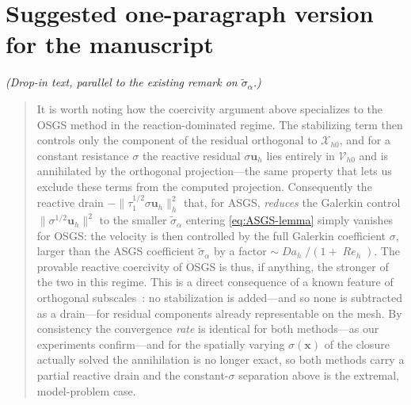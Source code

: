 \documentclass[11pt]{article}
\newcommand{\Reyn}{\operatorname{\mathit{Re}}}
\newcommand{\Damk}{\operatorname{\mathit{Da}}}
\theoremstyle{plain}
\theoremstyle{remark}
\newcommand{\uh}{\boldsymbol{u}_h}
\newcommand{\Xh}{\mathcal{X}_{h0}}
\newcommand{\siga}{\widetilde{\sigma}_\alpha}
\begin{document}
\section*{Suggested one-paragraph version for the manuscript}
\noindent\textit{(Drop-in text, parallel to the existing remark on $\siga$.)}
\begin{quote}\small
It is worth noting how the coercivity argument above specializes to the OSGS method
in the reaction-dominated regime. The stabilizing term then controls only the
component of the residual orthogonal to $\Xh$, and for a constant resistance
$\sigma$ the reactive residual $\sigma\uh$ lies entirely in $\mathcal{V}_{h0}$ and
is annihilated by the orthogonal projection---the same property that lets us exclude
these terms from the computed projection. Consequently the reactive drain
$-\|\tau_1^{1/2}\sigma\uh\|_h^2$ that, for ASGS, \emph{reduces} the Galerkin control
$\|\sigma^{1/2}\uh\|^2$ to the smaller $\siga$ entering \cref{eq:ASGS-lemma} simply
vanishes for OSGS: the velocity is then controlled by the full Galerkin coefficient
$\sigma$, larger than the ASGS coefficient $\siga$ by a factor
$\sim\Damk_h/(1+\Reyn_h)$. The provable reactive coercivity of OSGS is thus, if
anything, the stronger of the two in this regime. This is a direct consequence of a
known feature of orthogonal
subscales~\cite{gravenkamp2023dispersed,codina2002stabilized}: no stabilization is
added---and so none is subtracted as a drain---for residual components already
representable on the mesh. By consistency the convergence \emph{rate} is identical
for both methods---as our experiments confirm---and for the spatially varying
$\sigma(\boldsymbol{x})$ of the closure actually solved the annihilation is no
longer exact, so both methods carry a partial reactive drain and the
constant-$\sigma$ separation above is the extremal, model-problem case.
\end{quote}
\end{document}
